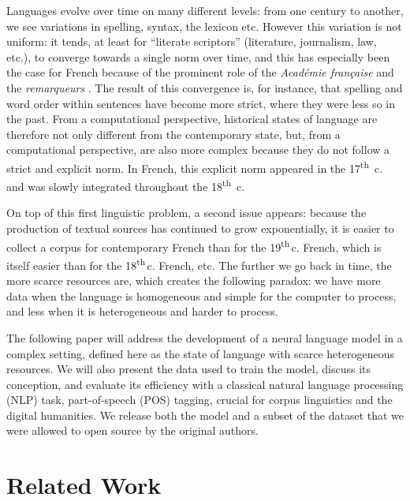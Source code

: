 Languages evolve over time on many different levels: from one century to another, we see variations in spelling, syntax, the lexicon etc. However this variation is not uniform: it tends, at least for ``literate scriptors'' (literature, journalism, law, etc.), to converge towards a single norm over time, and this has especially been the case for French because of the prominent role of the \textit{Académie française} and the \emph{remarqueurs} \cite{ayres-bennett_remarques_2011}. The result of this convergence is, for instance, that spelling and word order within sentences have become more strict, where they were less so in the past. From a computational perspective, historical states of language are therefore not only different from the contemporary state, but, from a computational perspective, are also more complex because they do not follow a strict and explicit norm. In French, this explicit norm  appeared in the 17\textsuperscript{th}~c. and was slowly integrated throughout the 18\textsuperscript{th}~c.

On top of this first linguistic problem, a second issue appears: because the production of textual sources has continued to grow exponentially, it is easier to collect a corpus for contemporary French  than for the 19\textsuperscript{th}\,c. French, which is itself easier than for the 18\textsuperscript{th}\,c. French, etc. The further we go back in time, the more scarce resources are, which creates the following paradox: we have more data when the language is homogeneous and simple for the computer to process, and less when it is heterogeneous and harder to process.

The following paper will address the development of \dalembert a neural language model in a complex setting, defined here as the state of language with scarce heterogeneous resources. We will also present \freemmax the data used to train the model, discuss its conception, and evaluate its efficiency with a classical natural language processing (NLP) task, part-of-speech (POS) tagging, crucial for corpus linguistics and the digital humanities. We release both the \dalembert model and a subset of the \freemmax dataset that we were allowed to open source by the original authors.

\section{Related Work}

